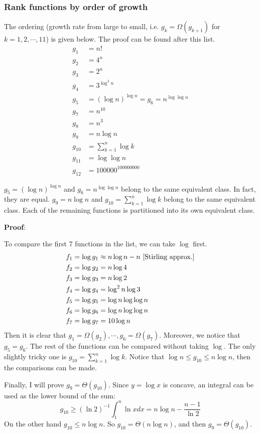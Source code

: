 \documentclass{article}
\begin{document}
\subsubsection{Rank functions by order of growth}
The ordering (growth rate from large to small, i.e. $g_k=\Omega(g_{k+1})$ for $k=1,2,\cdots,11$) is given below. The proof can be found after this list.
\begin{align*}
g_1&=n!\\
g_2&=4^n\\
g_3&=2^n\\
g_4&=3^{\log^2n}\\
g_5&=(\log n)^{\log n}=g_6=n^{\log\log n}\\
g_7&=n^{10}\\
g_8&=n^3\\
g_9&=n\log n\\
g_{10}&=\sum_{k=1}^n\log k\\
g_{11}&=\log\log n\\
g_{12}&=100000^{100000000}
\end{align*}

$g_5=(\log n)^{\log n}$ and $g_6=n^{\log\log n}$ belong to the same equivalent class. In fact, they are equal. $g_9=n\log n$ and $g_{10}=\sum_{k=1}^n\log k$ belong to the same equivalent class. Each of the remaining functions is partitioned into its own equivalent class.

\noindent\textbf{Proof}:

To compare the first 7 functions in the list, we can take $\log$ first.
\begin{align*}
f_1&=\log{g_1}\approx n\log n-n\textup{ [Stirling approx.]}\\
f_2&=\log{g_2}=n\log 4\\
f_3&=\log{g_3}=n\log 2\\
f_4&=\log{g_4}=\log^2n\log 3\\
f_5&=\log{g_5}=\log{n}\log\log{n}\\
f_6&=\log{g_6}=\log{n}\log\log{n}\\
f_7&=\log{g_7}=10\log n
\end{align*}
Then it is clear that $g_1=\Omega(g_2),\cdots,g_6=\Omega(g_7)$. Moreover, we notice that $g_5=g_6$. The rest of the functions can be compared without taking $\log$. The only slightly tricky one is $g_{10}=\sum_{k=1}^n\log k$. Notice that $\log n\leqslant g_{10}\leqslant n\log n$, then the comparisons can be made.

Finally, I will prove $g_9=\Theta(g_{10})$. Since $y=\log x$ is concave, an integral can be used as the lower bound of the sum:
\begin{equation*}
g_{10}\geqslant(\ln 2)^{-1}\int_1^n\ln xdx=n\log n-\frac{n-1}{\ln 2}
\end{equation*}
On the other hand $g_{10}\leqslant n\log n$. So $g_{10}=\Theta(n\log n)$, and then $g_9=\Theta(g_{10})$.
\end{document}
